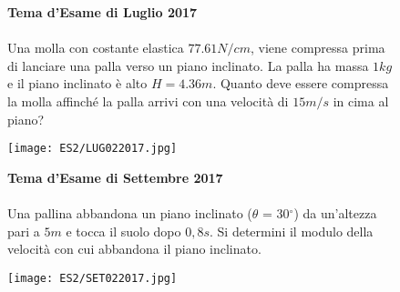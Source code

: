 \begin{figure}[h!]
\textbf{Tema d'Esame di Luglio 2017}\\ \\
Una molla con costante elastica $77.61 N/cm$, viene compressa prima di lanciare una palla verso un piano inclinato. La palla ha massa $1 kg$ e il piano inclinato è alto $H = 4.36 m$. Quanto deve essere compressa la molla affinché la palla arrivi con una velocità di $15 m/s$ in cima al piano?
\\
	\begin{center}
		\texttt{[image: ES2/LUG022017.jpg]}
	\end{center}
\end{figure}


\begin{figure}[h!]
\textbf{Tema d'Esame di Settembre 2017}\\ \\
Una pallina abbandona un piano inclinato ($\theta$ = 30$^{\circ}$) da un’altezza pari a $5 m$ e tocca il suolo dopo $0,8 s$. Si determini il modulo della velocità con cui abbandona il piano inclinato. 
\\
	\begin{center}
		\texttt{[image: ES2/SET022017.jpg]}
	\end{center}

	\noindent{}	
\end{figure}
